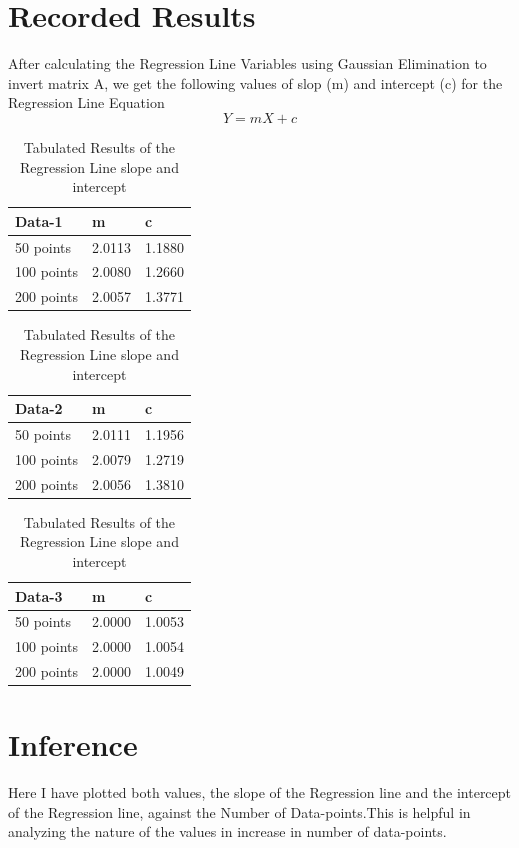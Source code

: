 \documentclass{article}
\begin{document}
\section{Recorded Results}

After calculating the Regression Line Variables using Gaussian Elimination to invert matrix A, we get the following values of slop (m) and intercept (c) for the Regression Line Equation \[ Y = mX + c\]
\begin{table}
	\begin{minipage}[b]{.30\textwidth}
		\centering
		\begin{tabular}{| l || l | l |}
			\hline
			Data-1 & m & c \\
			\hline \hline
			50 points & 2.0113 & 1.1880\\
			\hline 
			100 points & 2.0080 & 1.2660\\
			\hline 
			200 points & 2.0057 & 1.3771\\
			\hline
		\end{tabular}
	\end{minipage}\qquad
	\begin{minipage}[b]{.30\textwidth}
		\centering
		\begin{tabular}{| l || l | l |}
			\hline
			Data-2 & m & c \\
			\hline \hline
			50 points & 2.0111 & 1.1956\\
			\hline 
			100 points & 2.0079 & 1.2719\\
			\hline 
			200 points & 2.0056 & 1.3810\\
			\hline
		\end{tabular}
	\end{minipage}\qquad
	\begin{minipage}[b]{.30\textwidth}
		\centering
		\begin{tabular}{| l || l | l |}
			\hline
			Data-3 & m & c \\
			\hline \hline
			50 points & 2.0000 & 1.0053\\
			\hline 
			100 points & 2.0000 & 1.0054\\
			\hline 
			200 points & 2.0000 & 1.0049\\
			\hline
		\end{tabular}
\end{minipage}
	\caption{Tabulated Results of the Regression Line slope and intercept}
	\label{tab:revpol-2}
\end{table}
\pagebreak

\section{Inference}
 Here I have plotted both values, the slope of the Regression line and the intercept of the Regression line, against the Number of Data-points.This is helpful in analyzing the nature of the values in increase in number of data-points.
\end{document}
